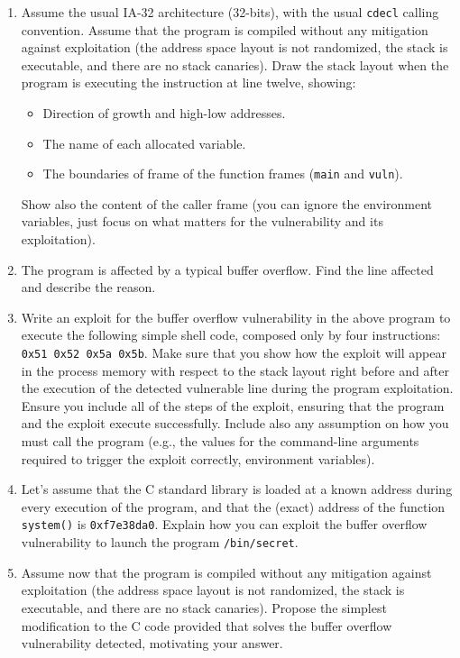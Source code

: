 \begin{enumerate}
    \item Assume the usual IA-32 architecture (32-bits), with the usual \texttt{cdecl} calling convention. 
    Assume that the program is compiled without any mitigation against exploitation (the address space layout is not randomized, the stack is executable, and there are no stack canaries).
    Draw the stack layout when the program is executing the instruction at line twelve, showing:
    \begin{itemize}
        \item Direction of growth and high-low addresses.
        \item The name of each allocated variable.
        \item The boundaries of frame of the function frames (\texttt{main} and \texttt{vuln}).
    \end{itemize}
    Show also the content of the caller frame (you can ignore the environment variables, just focus on what matters for the vulnerability and its exploitation).
    \item The program is affected by a typical buffer overflow. 
        Find the line affected and describe the reason. 
    \item Write an exploit for the buffer overflow vulnerability in the above program to execute the following simple shell code, composed only by four instructions: \texttt{0x51 0x52 0x5a 0x5b}. 
        Make sure that you show how the exploit will appear in the process memory with respect to the stack layout right before and after the execution of the detected vulnerable line during the program exploitation. 
        Ensure you include all of the steps of the exploit, ensuring that the program and the exploit execute successfully. 
        Include also any assumption on how you must call the program (e.g., the values for the command-line arguments required to trigger the exploit correctly, environment variables).
    \item Let's assume that the C standard library is loaded at a known address during every execution of the program, and
    that the (exact) address of the function \texttt{system()} is \texttt{0xf7e38da0}. 
        Explain how you can exploit the buffer overflow vulnerability to launch the program \texttt{/bin/secret}.
    \item Assume now that the program is compiled without any mitigation against exploitation (the address space layout is not randomized, the stack is executable, and there are no stack canaries). 
    Propose the simplest modification to the C code provided that solves the buffer overflow vulnerability detected, motivating your answer. 
\end{enumerate}

